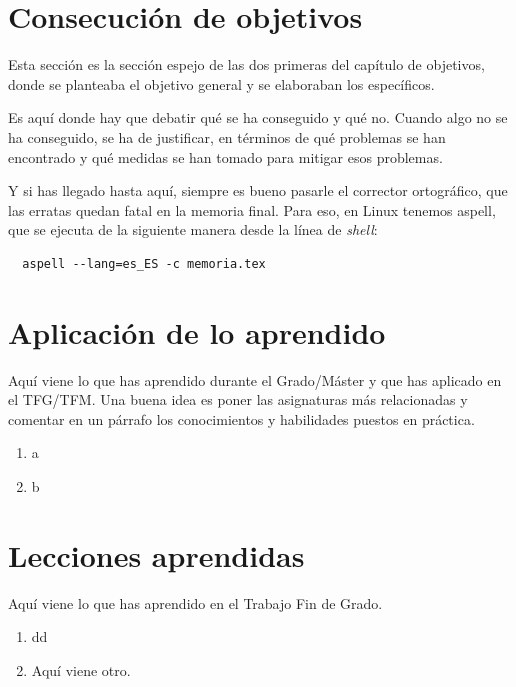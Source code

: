 \documentclass[a4paper, 12pt]{book}
\begin{document}
\section{Consecución de objetivos}
\label{sec:consecucion-objetivos}

Esta sección es la sección espejo de las dos primeras del capítulo de objetivos, donde se planteaba el objetivo general y se elaboraban los específicos.

Es aquí donde hay que debatir qué se ha conseguido y qué no. 
Cuando algo no se ha conseguido, se ha de justificar, en términos de qué problemas se han encontrado y qué medidas se han tomado para mitigar esos problemas.

Y si has llegado hasta aquí, siempre es bueno pasarle el corrector ortográfico, que las erratas quedan fatal en la memoria final.
Para eso, en Linux tenemos aspell, que se ejecuta de la siguiente manera desde la línea de \emph{shell}:

\begin{verbatim}
  aspell --lang=es_ES -c memoria.tex
\end{verbatim}

\section{Aplicación de lo aprendido}
\label{sec:aplicacion}

Aquí viene lo que has aprendido durante el Grado/Máster y que has aplicado en el TFG/TFM. Una buena idea es poner las asignaturas más relacionadas y comentar en un párrafo los conocimientos y habilidades puestos en práctica.

\begin{enumerate}
  \item a
  \item b
\end{enumerate}


\section{Lecciones aprendidas}
\label{sec:lecciones_aprendidas}

Aquí viene lo que has aprendido en el Trabajo Fin de Grado.

\begin{enumerate}
  \item dd
  \item Aquí viene otro.
\end{enumerate}
\end{document}
